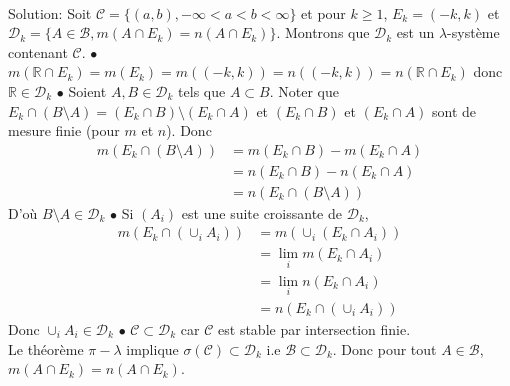 \documentclass{report}
\begin{document}
\subsection{} \\ \\

Solution:  Soit $\mathcal C = \{(a,b), -\infty <a<b<\infty \}$ et pour $k\geq 1$, \newline $E_k = (-k,k)$ et $\mathcal D_k = \{A\in \mathcal B, m(A\cap E_k) =  n(A\cap E_k)\}$. \newline
Montrons que $\mathcal D_k$ est un $\lambda$-système contenant $\mathcal C$. \newline \newline
$\bullet$ $m(\mathbb R\cap E_k) = m(E_k)=m((-k,k))=n((-k,k))=n(\mathbb R\cap E_k)$ donc $\mathbb R\in \mathcal D_k$\newline
 $\bullet$ Soient $A,B\in \mathcal D_k$ tels que $A\subset B$. Noter que $E_k\cap (B\setminus A) = (E_k\cap B)\setminus (E_k\cap A)$ et $(E_k\cap B)$ et $(E_k\cap A)$ sont de mesure finie (pour $m$ et $n$). Donc $$\begin{aligned}m(E_k\cap (B\setminus A)) &= m(E_k\cap B)-m(E_k\cap A)\\&=n(E_k\cap B)-n(E_k\cap A)\\&=n(E_k\cap (B\setminus A))\end{aligned}$$\newline
D'où $B\setminus A\in \mathcal D_k$\newline
$\bullet$ Si $(A_i)$ est une suite croissante de $\mathcal D_k$, $$\begin{aligned}m(E_k\cap (\cup_i A_i)) &= m(\cup_i(E_k\cap A_i))\\&= \lim_im(E_k\cap A_i)\\ &=\lim_i n(E_k\cap A_i)\\ &=n(E_k\cap (\cup_i A_i))  \end{aligned}$$\newline
Donc $\cup_i A_i \in \mathcal D_k$\newline
$\bullet$ $\mathcal C \subset \mathcal D_k$ car $\mathcal C$ est stable par intersection finie.\\

Le théorème $\pi-\lambda$ implique $\sigma(\mathcal C)\subset \mathcal D_k$ i.e $\mathcal B\subset \mathcal D_k$. Donc pour tout $A\in \mathcal B$, $m(A\cap E_k) = n(A\cap E_k)$.
\end{document}
